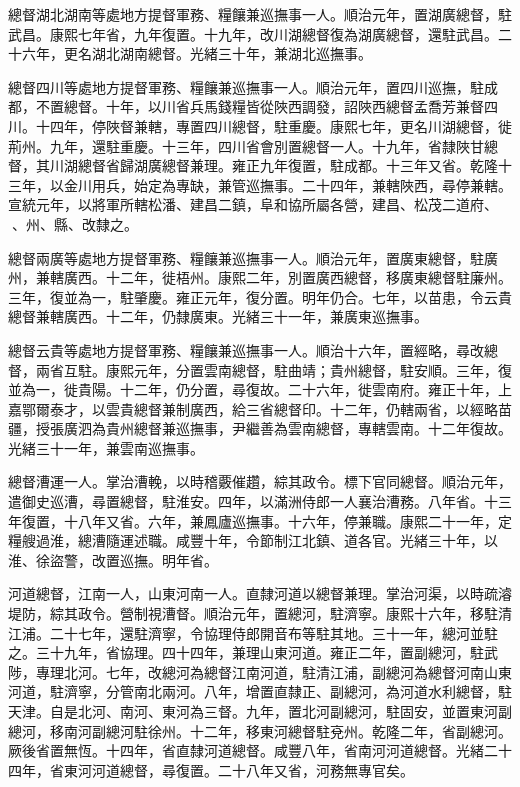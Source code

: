 \begin{pinyinscope}
總督湖北湖南等處地方提督軍務、糧饟兼巡撫事一人。順治元年，置湖廣總督，駐武昌。康熙七年省，九年復置。十九年，改川湖總督復為湖廣總督，還駐武昌。二十六年，更名湖北湖南總督。光緒三十年，兼湖北巡撫事。

總督四川等處地方提督軍務、糧饟兼巡撫事一人。順治元年，置四川巡撫，駐成都，不置總督。十年，以川省兵馬錢糧皆從陜西調發，詔陜西總督孟喬芳兼督四川。十四年，停陜督兼轄，專置四川總督，駐重慶。康熙七年，更名川湖總督，徙荊州。九年，還駐重慶。十三年，四川省會別置總督一人。十九年，省隸陜甘總督，其川湖總督省歸湖廣總督兼理。雍正九年復置，駐成都。十三年又省。乾隆十三年，以金川用兵，始定為專缺，兼管巡撫事。二十四年，兼轄陜西，尋停兼轄。宣統元年，以將軍所轄松潘、建昌二鎮，阜和協所屬各營，建昌、松茂二道府、、州、縣、改隸之。

總督兩廣等處地方提督軍務、糧饟兼巡撫事一人。順治元年，置廣東總督，駐廣州，兼轄廣西。十二年，徙梧州。康熙二年，別置廣西總督，移廣東總督駐廉州。三年，復並為一，駐肇慶。雍正元年，復分置。明年仍合。七年，以苗患，令云貴總督兼轄廣西。十二年，仍隸廣東。光緒三十一年，兼廣東巡撫事。

總督云貴等處地方提督軍務、糧饟兼巡撫事一人。順治十六年，置經略，尋改總督，兩省互駐。康熙元年，分置雲南總督，駐曲靖；貴州總督，駐安順。三年，復並為一，徙貴陽。十二年，仍分置，尋復故。二十六年，徙雲南府。雍正十年，上嘉鄂爾泰才，以雲貴總督兼制廣西，給三省總督印。十二年，仍轄兩省，以經略苗疆，授張廣泗為貴州總督兼巡撫事，尹繼善為雲南總督，專轄雲南。十二年復故。光緒三十一年，兼雲南巡撫事。

總督漕運一人。掌治漕輓，以時稽覈催趲，綜其政令。標下官同總督。順治元年，遣御史巡漕，尋置總督，駐淮安。四年，以滿洲侍郎一人襄治漕務。八年省。十三年復置，十八年又省。六年，兼鳳廬巡撫事。十六年，停兼職。康熙二十一年，定糧艘過淮，總漕隨運述職。咸豐十年，令節制江北鎮、道各官。光緒三十年，以淮、徐盜警，改置巡撫。明年省。

河道總督，江南一人，山東河南一人。直隸河道以總督兼理。掌治河渠，以時疏濬堤防，綜其政令。營制視漕督。順治元年，置總河，駐濟寧。康熙十六年，移駐清江浦。二十七年，還駐濟寧，令協理侍郎開音布等駐其地。三十一年，總河並駐之。三十九年，省協理。四十四年，兼理山東河道。雍正二年，置副總河，駐武陟，專理北河。七年，改總河為總督江南河道，駐清江浦，副總河為總督河南山東河道，駐濟寧，分管南北兩河。八年，增置直隸正、副總河，為河道水利總督，駐天津。自是北河、南河、東河為三督。九年，置北河副總河，駐固安，並置東河副總河，移南河副總河駐徐州。十二年，移東河總督駐兗州。乾隆二年，省副總河。厥後省置無恆。十四年，省直隸河道總督。咸豐八年，省南河河道總督。光緒二十四年，省東河河道總督，尋復置。二十八年又省，河務無專官矣。


\end{pinyinscope}
